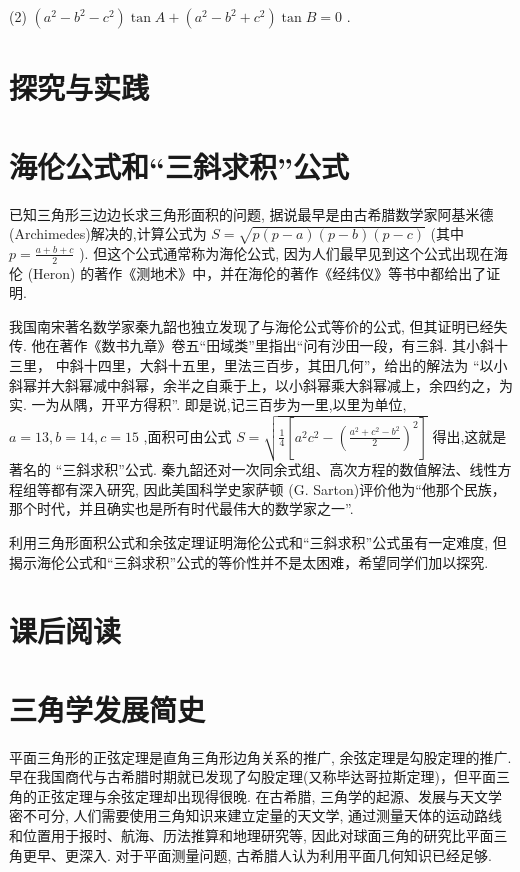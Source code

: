 \documentclass[10pt]{article}
\begin{document}
(2) \(\left( {{a}^{2} - {b}^{2} - {c}^{2}}\right) \tan A + \left( {{a}^{2} - {b}^{2} + {c}^{2}}\right) \tan B = 0\) .

\section*{探究与实践}

\section*{海伦公式和“三斜求积”公式}

已知三角形三边边长求三角形面积的问题, 据说最早是由古希腊数学家阿基米德 (Archimedes)解决的,计算公式为 \(S = \sqrt{p\left( {p - a}\right) \left( {p - b}\right) \left( {p - c}\right) }\) (其中 \(p = \frac{a + b + c}{2}\) ). 但这个公式通常称为海伦公式, 因为人们最早见到这个公式出现在海伦 (Heron) 的著作《测地术》中，并在海伦的著作《经纬仪》等书中都给出了证明.

我国南宋著名数学家秦九韶也独立发现了与海伦公式等价的公式, 但其证明已经失传. 他在著作《数书九章》卷五“田域类”里指出“问有沙田一段，有三斜. 其小斜十三里， 中斜十四里，大斜十五里，里法三百步，其田几何”，给出的解法为 “以小斜幂并大斜幂减中斜幂，余半之自乘于上，以小斜幂乘大斜幂减上，余四约之，为实. 一为从隅，开平方得积”. 即是说,记三百步为一里,以里为单位, \(a = {13},b = {14},c = {15}\) ,面积可由公式 \(S = \sqrt{\frac{1}{4}\left\lbrack  {{a}^{2}{c}^{2} - {\left( \frac{{a}^{2} + {c}^{2} - {b}^{2}}{2}\right) }^{2}}\right\rbrack  }\) 得出,这就是著名的 “三斜求积”公式. 秦九韶还对一次同余式组、高次方程的数值解法、线性方程组等都有深入研究, 因此美国科学史家萨顿 (G. Sarton)评价他为“他那个民族，那个时代，并且确实也是所有时代最伟大的数学家之一”.

利用三角形面积公式和余弦定理证明海伦公式和“三斜求积”公式虽有一定难度, 但揭示海伦公式和“三斜求积”公式的等价性并不是太困难，希望同学们加以探究.

\section*{课后阅读}

\section*{三角学发展简史}

平面三角形的正弦定理是直角三角形边角关系的推广, 余弦定理是勾股定理的推广. 早在我国商代与古希腊时期就已发现了勾股定理(又称毕达哥拉斯定理)，但平面三角的正弦定理与余弦定理却出现得很晚. 在古希腊, 三角学的起源、发展与天文学密不可分, 人们需要使用三角知识来建立定量的天文学, 通过测量天体的运动路线和位置用于报时、航海、历法推算和地理研究等, 因此对球面三角的研究比平面三角更早、更深入. 对于平面测量问题, 古希腊人认为利用平面几何知识已经足够.
\end{document}
